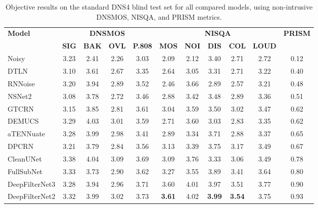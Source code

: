 \documentclass[final,5p,times,authoryear]{elsarticle}
\begin{document}
\begin{table}
    \centering
    \caption{Objective results on the standard DNS4 blind test set for all compared models, using non-intrusive DNSMOS, NISQA, and PRISM metrics.}
    \small
    \setlength{\tabcolsep}{4pt}
    \renewcommand{\arraystretch}{1.15}

    \begin{tabular}{lcccccccccc}
    \toprule
    \multirow{2}{*}{\textbf{Model}} & 
    \multicolumn{4}{c}{\textbf{DNSMOS}} & 
    \multicolumn{5}{c}{\textbf{NISQA}} &
    \multirow{2}{*}{\textbf{PRISM}} \\
    \cmidrule(lr){2-5} \cmidrule(lr){6-10}
     & \textbf{SIG} & \textbf{BAK} & \textbf{OVL} & \textbf{P.808} & 
     \textbf{MOS} & \textbf{NOI} & \textbf{DIS} & \textbf{COL} & \textbf{LOUD} & \\
    \midrule
    Noisy & 3.23 & 2.41 & 2.26 & 3.03 & 2.09 & 2.12 & 3.40 & 2.71 & 2.72 & \cellcolor{prismblue}0.12 \\
    \midrule
    DTLN & 3.10 & 3.61 & 2.67 & 3.35 & 2.64 & 3.05 & 3.31 & 2.71 & 3.22 & \cellcolor{prismblue}0.40 \\
    RNNoise & 3.20 & 3.94 & 2.89 & 3.52 & 2.46 & 3.66 & 2.89 & 2.57 & 3.21 & \cellcolor{prismblue}0.48 \\
    NSNet2 & 3.08 & 3.78 & 2.72 & 3.46 & 2.88 & 3.42 & 3.48 & 2.89 & 3.36 & \cellcolor{prismblue}0.51 \\
    GTCRN & 3.15 & 3.85 & 2.81 & 3.61 & 3.04 & 3.59 & 3.50 & 3.02 & 3.47 & \cellcolor{prismblue}0.62 \\
    DEMUCS & 3.29 & 4.03 & 3.01 & 3.59 & 2.71 & 3.60 & 3.03 & 2.83 & 3.35 & \cellcolor{prismblue}0.62 \\
    aTENNuate & 3.28 & 3.99 & 2.98 & 3.41 & 2.89 & 3.34 & 3.71 & 2.88 & 3.37 & \cellcolor{prismblue}0.65 \\
    DPCRN & 3.21 & 3.79 & 2.84 & 3.56 & 3.13 & 3.39 & 3.75 & 3.17 & 3.49 & \cellcolor{prismblue}0.67 \\
    CleanUNet & 3.38 & 4.04 & 3.09 & 3.69 & 3.09 & 3.76 & 3.33 & 3.06 & 3.49 & \cellcolor{prismblue}0.78 \\
    FullSubNet & 3.33 & 3.73 & 2.90 & 3.62 & 3.27 & 3.55 & 3.89 & 3.41 & 3.64 & \cellcolor{prismblue}0.80 \\
    DeepFilterNet3 & 3.28 & 3.94 & 2.96 & 3.71 & 3.60 & 4.01 & 3.97 & 3.51 & 3.77 & \cellcolor{prismblue}0.90 \\
    DeepFilterNet2 & 3.32 & 3.99 & 3.02 & 3.73 & \textbf{3.61} & 4.02 & \textbf{3.99} & \textbf{3.54} & 3.75 & \cellcolor{prismblue}0.93 \\

\end{tabular}
\end{table}
\end{document}
